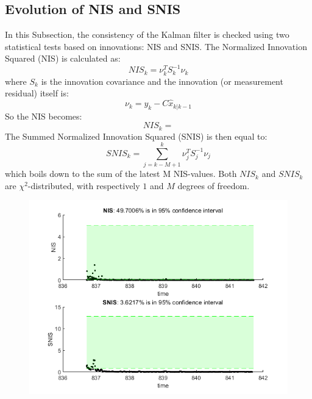 \documentclass[a4paper,kul]{kulakarticle} %
\begin{document}
\subsection{Evolution of NIS and SNIS}
In this Subsection, the consistency of the Kalman filter is checked using two statistical tests based on innovations: NIS and SNIS. The Normalized Innovation Squared (NIS) is calculated as:
\begin{equation}
	NIS_k = \nu_k^T S_k^{-1}\nu_k
\end{equation}
where $S_k$ is the innovation covariance and the innovation (or measurement residual) itself is:
\begin{equation}
	\nu_k = y_k - C \hat{x}_{k|k-1}
\end{equation}
So the NIS becomes:
\begin{equation}
	NIS_k = 
\end{equation}
The Summed Normalized Innovation Squared (SNIS) is then equal to:
\begin{equation}
	SNIS_k = \sum_{j = k-M+1}^{k} \nu_j^T S_j^{-1}\nu_j
\end{equation}
which boils down to the sum of the latest M NIS-values. Both $NIS_k$ and $SNIS_k$ are $\chi^2$-distributed, with respectively $1$ and $M$ degrees of freedom.


\begin{figure}
	\centering
	\includegraphics[width =0.48\linewidth]{rho10.png}
\end{figure}













\newpage


\end{document}
